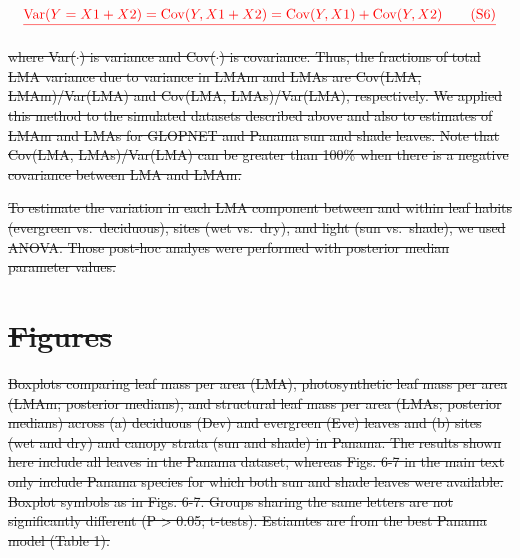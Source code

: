 \documentclass[
  12pt,
  letterpaper,
  DIV=11,
  numbers=noendperiod]{scrartcl}
\numberwithin{equation}{section} %
\providecommand{\DIFadd}[1]{{\protect\color{blue}\uwave{#1}}} %
\providecommand{\DIFdel}[1]{{\protect\color{red}\sout{#1}}}                      %
\providecommand{\DIFaddbegin}{} %
\providecommand{\DIFaddend}{} %
\providecommand{\DIFdelbegin}{} %
\providecommand{\DIFdelend}{} %
\newcommand{\DIFscaledelfig}{0.5}
\newlength{\DIFdelgraphicswidth} %
\newlength{\DIFdelgraphicsheight} %
\newcommand{\DIFaddincludegraphics}[2][]{{\color{blue}\fbox{\DIFOincludegraphics[#1]{#2}}}} %
\newcommand{\DIFdelincludegraphics}[2][]{%
\sbox{\DIFdelgraphicsbox}{\DIFOincludegraphics[#1]{#2}}%
\settoboxwidth{\DIFdelgraphicswidth}{\DIFdelgraphicsbox} %
\settoboxtotalheight{\DIFdelgraphicsheight}{\DIFdelgraphicsbox} %
\scalebox{\DIFscaledelfig}{%
\parbox[b]{\DIFdelgraphicswidth}{\usebox{\DIFdelgraphicsbox}\\[-\baselineskip] \rule{\DIFdelgraphicswidth}{0em}}\llap{\resizebox{\DIFdelgraphicswidth}{\DIFdelgraphicsheight}{%
\setlength{\unitlength}{\DIFdelgraphicswidth}%
\begin{picture}(1,1)%
\thicklines\linethickness{2pt} %
{\color[rgb]{1,0,0}\put(0,0){\framebox(1,1){}}}%
{\color[rgb]{1,0,0}\put(0,0){\line( 1,1){1}}}%
{\color[rgb]{1,0,0}\put(0,1){\line(1,-1){1}}}%
\end{picture}%
}\hspace*{3pt}}} %
} %
\DeclareRobustCommand{\DIFaddbegin}{\DIFOaddbegin \let\includegraphics\DIFaddincludegraphics} %
\DeclareRobustCommand{\DIFaddend}{\DIFOaddend \let\includegraphics\DIFOincludegraphics} %
\DeclareRobustCommand{\DIFdelbegin}{\DIFOdelbegin \let\includegraphics\DIFdelincludegraphics} %
\DeclareRobustCommand{\DIFdelend}{\DIFOaddend \let\includegraphics\DIFOincludegraphics} %
\begin{document}
\[
\DIFdel{\mathrm{Var}(Y = X1 + X2) = \mathrm{Cov}(Y, X1+X2) = \mathrm{Cov}(Y,X1) + \mathrm{Cov}(Y,X2) \qquad(\mathrm{S}6)
}\]%

\DIFdel{where Var(\(\cdot\)) is variance and Cov(\(\cdot\)) is covariance. Thus,
the fractions of total LMA variance due to variance in LMAm and LMAs are
Cov(LMA, LMAm)/Var(LMA) and Cov(LMA, LMAs)/Var(LMA), respectively. We
applied this method to the simulated datasets described above and also
to estimates of LMAm and LMAs for GLOPNET and Panama sun and shade
leaves. Note that Cov(LMA, LMAs)/Var(LMA) can be greater than 100\% when
there is a negative covariance between LMA and LMAm.
}%

\DIFdel{To estimate the variation in each LMA component between and within leaf
habits (evergreen vs.~deciduous), sites (wet vs.~dry), and light (sun
vs.~shade), we used ANOVA. Those post-hoc analyes were performed with
posterior median parameter values.
}%

\DIFdelend \newpage

\section{\DIFdelbegin \DIFdel{Figures}\DIFdelend \DIFaddbegin \DIFadd{Stan code}\DIFaddend }\DIFdelbegin %





{%
\DIFdel{Boxplots comparing leaf mass per area
(LMA), photosynthetic leaf mass per area (LMAm; posterior medians), and
structural leaf mass per area (LMAs; posterior medians) across (a)
deciduous (Dev) and evergreen (Eve) leaves and (b) sites (wet and dry)
and canopy strata (sun and shade) in Panama. The results shown here
include all leaves in the Panama dataset, whereas Figs. 6-7 in the main
text only include Panama species for which both sun and shade leaves
were available. Boxplot symbols as in Figs. 6-7. Groups sharing the same
letters are not significantly different (P \textgreater{} 0.05;
t-tests). Estiamtes are from the best Panama model (Table 1).}}
\end{document}
